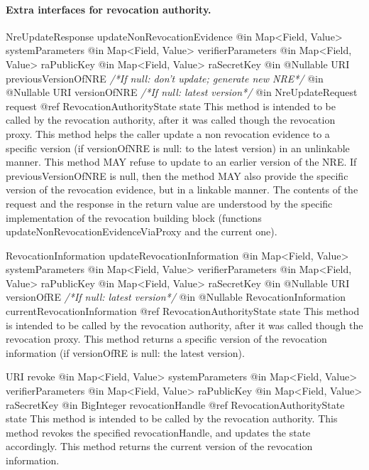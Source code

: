     \paragraph{Extra interfaces for revocation authority.}
      \begin{method}
      {NreUpdateResponse}
      {updateNonRevocationEvidence}
      {
        {@in Map<Field, Value> systemParameters}
        {@in Map<Field, Value> verifierParameters}
        {@in Map<Field, Value> raPublicKey}
        {@in Map<Field, Value> raSecretKey}
        {@in @Nullable URI previousVersionOfNRE \textrm{\textit{/*If null: don't update; generate new NRE*/}}}
        {@in @Nullable URI versionOfNRE \textrm{\textit{/*If null: latest version*/}}}
        {@in NreUpdateRequest request}
        {@ref RevocationAuthorityState state}
      }
      This method is intended to be called by the revocation authority, after it
      was called though the revocation proxy.
      This method helps the caller update a non revocation evidence to a specific version
      (if versionOfNRE is null: to the latest version) in an unlinkable manner.
      This method MAY refuse to update to an earlier version of the NRE.
      If previousVersionOfNRE is null, then the method MAY also
      provide the specific version of the revocation evidence, but in a
      linkable manner.
      The contents of the request and the response in the return value are understood by the specific implementation of the revocation building block
      (functions updateNonRevocationEvidenceViaProxy and the current one).
      \end{method}
      \begin{method}
      {RevocationInformation}
      {updateRevocationInformation}
      {
        {@in Map<Field, Value> systemParameters}
        {@in Map<Field, Value> verifierParameters}
        {@in Map<Field, Value> raPublicKey}
        {@in Map<Field, Value> raSecretKey}
        {@in @Nullable URI versionOfRE \textrm{\textit{/*If null: latest version*/}}}
        {@in @Nullable RevocationInformation currentRevocationInformation}
        {@ref RevocationAuthorityState state}
      }
      This method is intended to be called by the revocation authority, after it was called
      though the revocation proxy.
      This method returns
      a specific version of the revocation information
      (if versionOfRE is null: the latest version).
      \end{method}
      \begin{method}
      {URI}
      {revoke}
      {
        {@in Map<Field, Value> systemParameters}
        {@in Map<Field, Value> verifierParameters}
        {@in Map<Field, Value> raPublicKey}
        {@in Map<Field, Value> raSecretKey}
        {@in BigInteger revocationHandle}
        {@ref RevocationAuthorityState state}
      }
      This method is intended to be called by the revocation authority.
      This method revokes the specified revocationHandle, and updates
      the state accordingly.
      This method returns the current version of the revocation information.
      \end{method}
